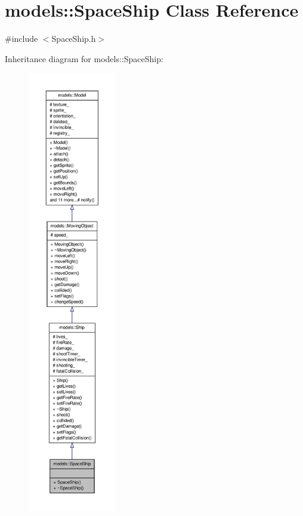 \hypertarget{classmodels_1_1SpaceShip}{\section{models\-:\-:\-Space\-Ship \-Class \-Reference}
\label{d2/d9b/classmodels_1_1SpaceShip}
}


{\ttfamily \#include $<$\-Space\-Ship.\-h$>$}



\-Inheritance diagram for models\-:\-:\-Space\-Ship\-:
\nopagebreak
\begin{figure}[H]
\begin{center}
\leavevmode
\includegraphics[height=550pt]{d6/d03/classmodels_1_1SpaceShip__inherit__graph}
\end{center}
\end{figure}


